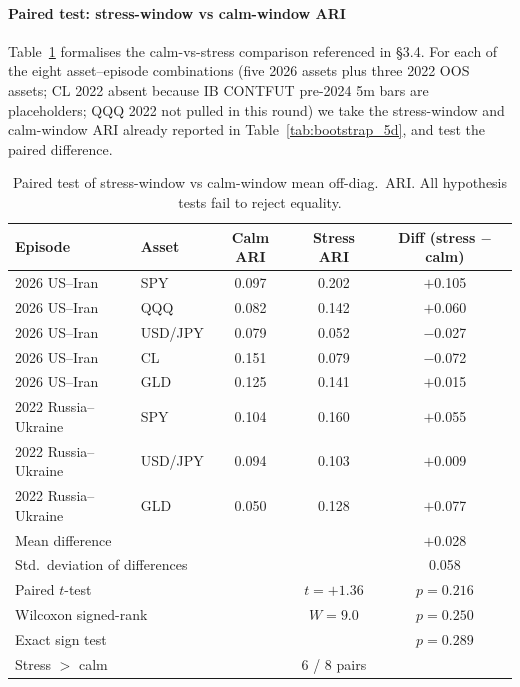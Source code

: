 \documentclass[preprint,12pt,authoryear]{elsarticle}
\newcommand{\CL}{CL}
\begin{document}
\paragraph{Paired test: stress-window vs calm-window ARI}
Table~\ref{tab:stress_vs_calm} formalises the calm-vs-stress comparison referenced in \S{}3.4. For each of the eight asset--episode combinations (five 2026 assets plus three 2022 OOS assets; \CL{} 2022 absent because IB CONTFUT pre-2024 5m bars are placeholders; QQQ 2022 not pulled in this round) we take the stress-window and calm-window ARI already reported in Table~\ref{tab:bootstrap_5d}, and test the paired difference.

\begin{table}[H]
\centering
\small
\setlength{\tabcolsep}{5pt}
\caption{Paired test of stress-window vs calm-window mean off-diag.\ ARI. All hypothesis tests fail to reject equality.}
\label{tab:stress_vs_calm}
\begin{tabular}{llccc}
\toprule
Episode & Asset & Calm ARI & Stress ARI & Diff (stress $-$ calm) \\
\midrule
2026 US--Iran & SPY & 0.097 & 0.202 & $+$0.105 \\
2026 US--Iran & QQQ & 0.082 & 0.142 & $+$0.060 \\
2026 US--Iran & USD/JPY & 0.079 & 0.052 & $-$0.027 \\
2026 US--Iran & CL & 0.151 & 0.079 & $-$0.072 \\
2026 US--Iran & GLD & 0.125 & 0.141 & $+$0.015 \\
2022 Russia--Ukraine & SPY & 0.104 & 0.160 & $+$0.055 \\
2022 Russia--Ukraine & USD/JPY & 0.094 & 0.103 & $+$0.009 \\
2022 Russia--Ukraine & GLD & 0.050 & 0.128 & $+$0.077 \\
\midrule
\multicolumn{3}{l}{Mean difference} & & $+$0.028 \\
\multicolumn{3}{l}{Std.\ deviation of differences} & & 0.058 \\
\multicolumn{3}{l}{Paired $t$-test} & $t = +1.36$ & $p = 0.216$ \\
\multicolumn{3}{l}{Wilcoxon signed-rank} & $W = 9.0$ & $p = 0.250$ \\
\multicolumn{3}{l}{Exact sign test} &  & $p = 0.289$ \\
\multicolumn{3}{l}{Stress $>$ calm} & 6 / 8 pairs & \\

\end{tabular}
\end{table}
\end{document}
